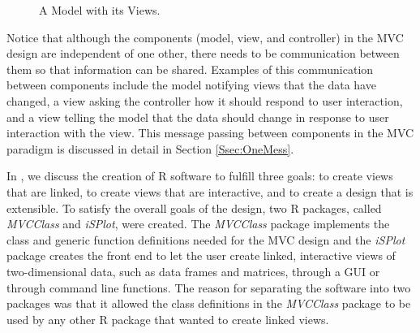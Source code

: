 \documentclass{article}[11pt]
\newcommand{\Rpackage}[1]{{\textit{#1}}}
\begin{document}
\begin{figure}[ht]
  \begin{center}
    \caption{ A Model with its Views. }
    \label{Fig:ExMVC}
  \end{center}
\end{figure}

Notice that although the components (model, view, and controller) in the MVC
design are independent of one other, there needs to be communication
between them so that information can be shared.  Examples of this
communication between components include the model notifying views that the
data have changed, a view asking the controller how it should respond to user
interaction, and a view telling the model that the data should change in
response to user interaction with the view.  This message passing between
components in the MVC paradigm is discussed in detail in Section
\ref{Ssec:OneMess}.   

In \cite{EW05}, we discuss the creation of R software to fulfill three goals:
to create views that are linked, to create views that are interactive, and to
create a design that is extensible.  To satisfy the overall goals of the
design, two R packages, called \Rpackage{MVCClass} and \Rpackage{iSPlot},
were created.  The \Rpackage{MVCClass} package implements the class and
generic function definitions needed for the MVC design and the
\Rpackage{iSPlot} package creates the front end to let the user create linked,
interactive views of two-dimensional data, such as data frames and matrices,
through a GUI or through command line functions.  The reason for
separating the software into two packages was that it allowed the class
definitions in the \Rpackage{MVCClass} package to be used by any other R
package that wanted to create linked views. 
\end{document}

